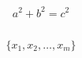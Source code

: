 \documentclass{article}
\begin{document}
\[
  a^2 + b^2 = c^2
\]

\[

\]

\[
  \{x_1,x_2,\ldots,x_m\}
\]

\[

\]

\end{document}
